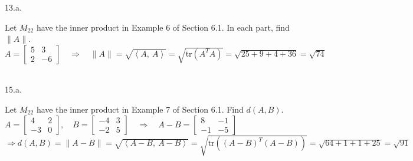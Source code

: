 \documentclass[12pt]{book}
\begin{document}
\begin{CJK}{UTF8}{bsmi}
13.a. \begin{minipage}[t]{\dimexpr\linewidth}
Let $M_{22}$ have the inner product in Example 6 of Section 6.1. In each part, find $\parallel A\parallel$. \\
$A=\begin{bmatrix}
5 & 3 \\
2 & -6
\end{bmatrix}\quad\Rightarrow\quad\parallel A\parallel=\sqrt{\left\langle A,\ A \right\rangle}=\sqrt{\mathrm{tr}(A^TA)}=\sqrt{25+9+4+36}=\sqrt{74}$
\end{minipage} \\

15.a. \begin{minipage}[t]{\dimexpr\linewidth}
Let $M_{22}$ have the inner product in Example 7 of Section 6.1. Find $d(A,B)$. \\
$A=\begin{bmatrix}
4 & 2 \\
-3 & 0
\end{bmatrix},\quad B=\begin{bmatrix}
-4 & 3 \\
-2 & 5
\end{bmatrix}\quad\Rightarrow\quad A-B=\begin{bmatrix}
8 & -1 \\
-1 & -5
\end{bmatrix}$ \\
$\Rightarrow d(A,B)=\parallel A-B \parallel=\sqrt{\left\langle A-B,\ A-B \right\rangle}=\sqrt{\mathrm{tr}((A-B)^T(A-B))}=\sqrt{64+1+1+25}=\sqrt{91}$
\end{minipage}


\end{CJK}
\end{document}
